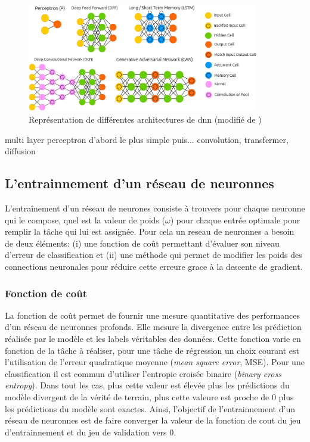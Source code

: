 \begin{figure}[!htbp]
 \centering
 \includegraphics[width=0.9\textwidth]{figures/dnn_archi.png}
 \caption[Représentation de différentes architectures de \gls{dnn}]{Représentation de différentes architectures de \gls{dnn} (modifié de \cite{leijnen_neural_2016})}
 \label{fig:dnn_archi}
\end{figure}
multi layer perceptron d'abord le plus simple puis... convolution, transfermer, diffusion

\subsection{L'entrainnement d'un réseau de neuronnes}
L'entraînement d'un réseau de neurones consiste à trouvers pour chaque neuronne qui le compose, quel est la valeur de poids ($\omega$) pour chaque entrée optimale pour remplir la tâche qui lui est assignée. Pour cela un reseau de neuronnes a besoin de deux éléments: (i) une fonction de coût permettant d'évaluer son niveau d'erreur de classification et (ii) une méthode qui permet de modifier les poids des connections neuronales pour réduire cette erreure grace à la descente de gradient.

\subsubsection{Fonction de coût}
La fonction de coût permet de fournir une mesure quantitative des performances d'un réseau de neuronnes profonds. Elle mesure la divergence entre les prédiction réalisée par le modèle et les labels véritables des données. Cette fonction varie en fonction de la tâche à réaliser, pour une tâche de régression un choix courant est l'utilisation de l'erreur quadratique moyenne (\textit{mean square error}, MSE). Pour une classification il est commun d'utiliser l'entropie croisée binaire (\textit{binary cross entropy}). 
Dans tout les cas, plus cette valeur est élevée plus les prédictions du modèle divergent de la vérité de terrain, plus cette valeure est proche de 0 plus les prédictions du modèle sont exactes. Ainsi, l'objectif de l'entrainnement d'un réseau de neuronnes est de faire converger la valeur de la fonction de cout du jeu d'entrainnement et du jeu de validation vers 0. 

